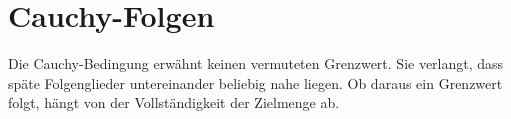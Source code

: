 \documentclass[main.tex]{subfiles}
\begin{document}
\section{Cauchy-Folgen}


Die Cauchy-Bedingung erwähnt keinen vermuteten Grenzwert. Sie verlangt, dass
späte Folgenglieder untereinander beliebig nahe liegen. Ob daraus ein
Grenzwert folgt, hängt von der Vollständigkeit der Zielmenge ab.
\end{document}
